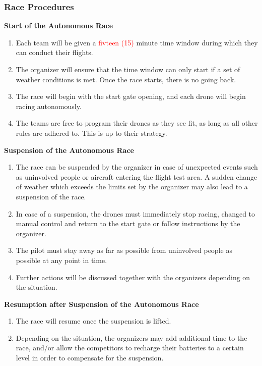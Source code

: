     \subsubsection{Race Procedures}
    \textbf{Start of the Autonomous Race}
    \begin{enumerate}
    \item Each team will be given a \textcolor{red}{fivteen (15)} minute time window during which they can conduct their flights. 
    \item The organizer will ensure that the time window can only start if a set of weather conditions is met. Once the race starts, there is no going back.
    \item The race will begin with the start gate opening, and each drone will begin racing autonomously.
    \item The teams are free to program their drones as they see fit, as long as all other rules are adhered to. This is up to their strategy.
    \end{enumerate}

    \textbf{Suspension of the Autonomous Race}
    \begin{enumerate}[resume]
    \item The race can be suspended by the organizer in case of unexpected events such as uninvolved people or aircraft entering the flight test area. A sudden change of weather which exceeds the limits set by the organizer may also lead to a suspension of the race.
    \item In case of a suspension, the drones must immediately stop racing, changed to manual control and return to the start gate or follow instructions by the organizer.
    \item The pilot must stay away as far as possible from uninvolved people as possible at any point in time.
    \item Further actions will be discussed together with the organizers depending on the situation.
    \end{enumerate}

    \textbf{Resumption after Suspension of the Autonomous Race}
    \begin{enumerate}[resume]
    \item The race will resume once the suspension is lifted.
    \item Depending on the situation, the organizers may add additional time to the race, and/or allow the competitors to recharge their batteries to a certain level in order to compensate for the suspension.
    \end{enumerate}



